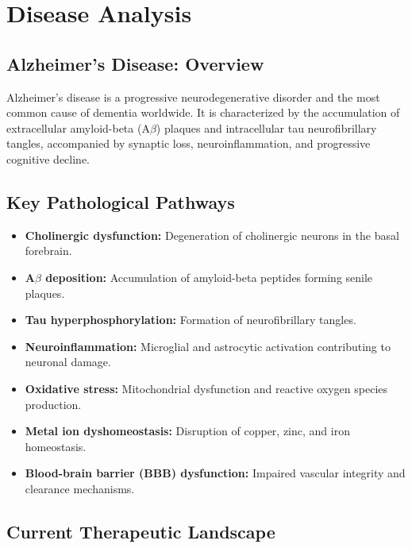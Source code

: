 \documentclass[11pt, a4paper]{article}
\begin{document}
\section{Disease Analysis}

\subsection{Alzheimer's Disease: Overview}

Alzheimer's disease is a progressive neurodegenerative disorder and the most common cause of dementia worldwide. It is characterized by the accumulation of extracellular amyloid-beta (A$\beta$) plaques and intracellular tau neurofibrillary tangles, accompanied by synaptic loss, neuroinflammation, and progressive cognitive decline.

\subsection{Key Pathological Pathways}

\begin{itemize}
    \item \textbf{Cholinergic dysfunction:} Degeneration of cholinergic neurons in the basal forebrain.
    \item \textbf{A$\beta$ deposition:} Accumulation of amyloid-beta peptides forming senile plaques.
    \item \textbf{Tau hyperphosphorylation:} Formation of neurofibrillary tangles.
    \item \textbf{Neuroinflammation:} Microglial and astrocytic activation contributing to neuronal damage.
    \item \textbf{Oxidative stress:} Mitochondrial dysfunction and reactive oxygen species production.
    \item \textbf{Metal ion dyshomeostasis:} Disruption of copper, zinc, and iron homeostasis.
    \item \textbf{Blood-brain barrier (BBB) dysfunction:} Impaired vascular integrity and clearance mechanisms.
\end{itemize}

\subsection{Current Therapeutic Landscape}
\end{document}
